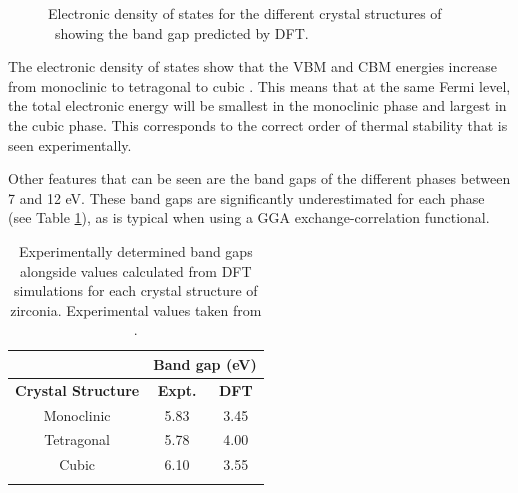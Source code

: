 \begin{figure}[ht] %
\begin{center}
		\caption{Electronic density of states for the different crystal structures of \zirconia\ showing the band gap predicted by DFT.}
		\label{figure:densityofstates}
	\end{center}
\end{figure}

The electronic density of states show that the VBM and CBM energies increase from monoclinic to tetragonal to cubic \zirconia . This means that at the same Fermi level, the total electronic energy will be smallest in the monoclinic phase and largest in the cubic phase. This corresponds to the correct order of thermal stability that is seen experimentally. 

Other features that can be seen are the band gaps of the different phases between 7 and 12 eV. These band gaps are significantly underestimated for each phase (see Table \ref{table:bandgap}), as is typical when using a GGA exchange-correlation functional.

\begin{table}[ht] %
\onehalfspacing
\centering
\caption[Experimentally determined band gaps alongside values calculated from DFT simulations for each crystal structure of zirconia.]{Experimentally determined band gaps alongside values calculated from DFT simulations for each crystal structure of zirconia. Experimental values taken from \cite{French1994}.}
\begin{tabular}{ccc}
{\bf }                                       & \multicolumn{2}{c}{{\bf Band gap (eV)}}      \\ \hline
\multicolumn{1}{c}{{\bf Crystal Structure}} & \multicolumn{1}{c}{{\bf Expt.}} & {\bf DFT} \\ \hline
\multicolumn{1}{c}{Monoclinic}              & \multicolumn{1}{c}{5.83}        & 3.45      \\
\multicolumn{1}{c}{Tetragonal}              & \multicolumn{1}{c}{5.78}        & 4.00      \\
\multicolumn{1}{c}{Cubic}                   & \multicolumn{1}{c}{6.10}         &   3.55 \\ \hline
\label{table:bandgap}
\end{tabular}
\end{table}

